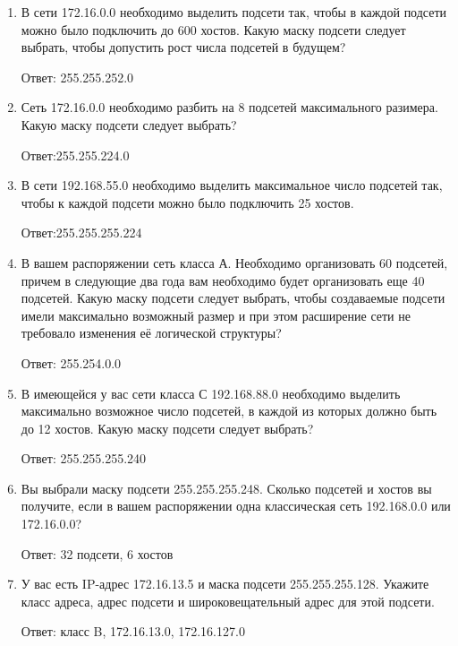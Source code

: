 \documentclass[bachelor, och, labwork]{shiza}
\begin{document}
\begin{enumerate}
    
    \item В сети 172.16.0.0 необходимо выделить подсети так, чтобы в каждой подсети можно было подключить до 600 хостов. Какую 
    маску подсети следует выбрать, чтобы допустить рост числа подсетей в будущем?

    Ответ: 255.255.252.0

    \item Сеть 172.16.0.0 необходимо разбить на 8 подсетей максимального разимера. Какую маску подсети следует выбрать?
    
    Ответ:255.255.224.0

    \item В сети 192.168.55.0 необходимо выделить максимальное число подсетей так, чтобы к каждой подсети можно было подключить 25 хостов. 
    
    Ответ:255.255.255.224

    \item В вашем распоряжении сеть класса А. Необходимо организовать 60 подсетей, причем в следующие два года вам необходимо будет 
    организовать еще 40 подсетей. Какую маску подсети следует выбрать, чтобы создаваемые подсети имели максимально возможный размер и при 
    этом расширение сети не требовало изменения её логической структуры?

    Ответ: 255.254.0.0

    \item В имеющейся у вас сети класса С 192.168.88.0 необходимо выделить максимально возможное число подсетей, в каждой из которых 
    должно быть до 12 хостов. Какую маску подсети следует выбрать?

    Ответ: 255.255.255.240

    \item Вы выбрали маску подсети 255.255.255.248. Сколько подсетей и хостов вы получите, если в вашем распоряжении одна классическая сеть 192.168.0.0 или 172.16.0.0?
    
    Ответ: 32 подсети, 6 хостов

    \item У вас есть IP-адрес 172.16.13.5 и маска подсети 255.255.255.128. Укажите класс адреса, адрес подсети и широковещательный адрес для этой подсети.
    
    Ответ: класс B, 172.16.13.0, 172.16.127.0
\end{enumerate}
\end{document}
